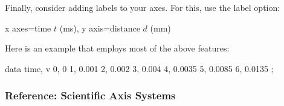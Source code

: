 Finally, consider adding labels to your axes. For this, use the label option:
%
\begin{codeexample}
x axes={time $t$ (ms)}, y axis={distance $d$ (mm)}
\end{codeexample}

Here is an example that employs most of the above features:
%
\begin{codeexample}[width=8.5cm,preamble={\usetikzlibrary{datavisualization}}]
\tikz \datavisualization [
  scientific axes=clean,
  x axis={attribute=time, ticks={tick unit=ms},
    label={elapsed time}},
  y axis={attribute=v, ticks={tick unit=m/s},
    label={speed of disc}},
  all axes=grid,
  visualize as line]
data {
  time, v
  0, 0
  1, 0.001
  2, 0.002
  3, 0.004
  4, 0.0035
  5, 0.0085
  6, 0.0135
};
\end{codeexample}


\subsubsection{Reference: Scientific Axis Systems}

